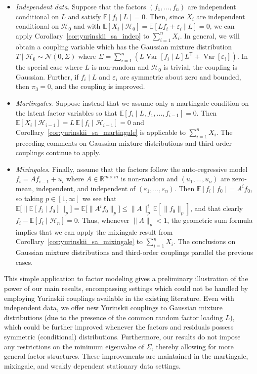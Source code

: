 \documentclass[11pt,lof]{puthesis}
\newcommand{\R}{\ensuremath{\mathbb{R}}}
\newcommand{\E}{\ensuremath{\mathbb{E}}}
\newcommand{\cH}{\ensuremath{\mathcal{H}}}
\newcommand{\cN}{\ensuremath{\mathcal{N}}}
\newcommand{\T}{\ensuremath{\mathsf{T}}}
\DeclareMathOperator{\Var}{Var}
\theoremstyle{break}
\theoremstyle{proof}
\begin{document}
\begin{itemize}
  \item \emph{Independent data}.
    Suppose that the factors $(f_1, \ldots,
    f_n)$ are independent conditional on $L$ and satisfy
    $\E [ f_i \mid L ] = 0$.
    Then, since $X_i$ are independent conditional on $\cH_0$ and with
    $\E [ X_i \mid \cH_0 ] = \E [ L f_i + \varepsilon_i \mid L ] = 0$,
    we can apply Corollary~\ref{cor:yurinskii_sa_indep} to $\sum_{i=1}^n X_i$.
    In general, we will obtain a coupling variable which has the Gaussian
    mixture distribution $T \mid \cH_0 \sim \cN(0, \Sigma)$ where
    $\Sigma= \sum_{i=1}^n (L\Var[f_i \mid L]L^\T +\Var[\varepsilon_i])$.
    In the special case where $L$ is non-random
    and $\cH_0$ is trivial, the coupling is Gaussian. Further,
    if $f_i\mid L$ and $\varepsilon_i$ are symmetric about zero
    and bounded, then $\pi_3=0$, and the coupling is improved.

  \item \emph{Martingales}.
    Suppose instead that we assume only a martingale
    condition on the latent factor variables so that
    $\E \left[ f_i \mid L, f_1, \ldots, f_{i-1} \right] = 0$.
    Then $\E [ X_i \mid \cH_{i-1} ]
    = L\, \E \left[ f_i \mid \cH_{i-1} \right] = 0$
    and Corollary~\ref{cor:yurinskii_sa_martingale} is applicable to
    $\sum_{i=1}^n X_i$.
    The preceding comments on Gaussian mixture distributions
    and third-order couplings continue to apply.

  \item \emph{Mixingales}.
    Finally, assume that the factors follow the
    auto-regressive model $f_i = A f_{i-1} + u_i$ where
    $A \in \R^{m \times m}$ is non-random and $(u_1, \ldots, u_n)$ are
    zero-mean, independent, and independent of
    $(\varepsilon_1, \ldots, \varepsilon_n)$.
    Then $\E \left[ f_i \mid f_0 \right] = A^i f_0$, so taking
    $p \in [1, \infty]$ we see that
    $\E \big[ \| \E [ f_i \mid f_0 ] \|_p \big]
    = \E \big[ \| A^i f_0 \|_p \big] \leq \|A\|_p^i\,\E [ \|f_0\|_p ]$,
    and that clearly $f_i - \E [ f_i \mid \cH_n ] = 0$.
    Thus, whenever $\|A\|_p < 1$, the geometric sum formula implies that
    we can apply the mixingale result from
    Corollary~\ref{cor:yurinskii_sa_mixingale} to
    $\sum_{i=1}^n X_i$. The conclusions on Gaussian mixture distributions
    and third-order couplings parallel the previous cases.
\end{itemize}

This simple application to factor modeling gives a preliminary illustration of
the power of our main results, encompassing settings which could not be handled
by employing Yurinskii couplings available in the existing literature. Even
with independent data, we offer new Yurinskii couplings to Gaussian mixture
distributions (due to the presence of the common random factor loading $L$),
which could be further improved whenever the factors and residuals possess
symmetric (conditional) distributions. Furthermore, our results do not impose
any restrictions on the minimum eigenvalue of $\Sigma$, thereby allowing for
more general factor structures. These improvements are maintained in the
martingale, mixingale, and weakly dependent stationary data settings.
\end{document}
